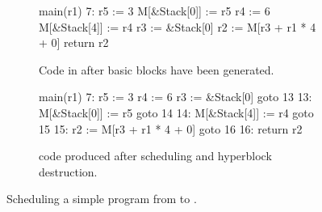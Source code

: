 \begin{figure}
  \centering
    \begin{subfigure}[b]{0.48\linewidth}
\lstset{numbers=left,basicstyle=\footnotesize\ttfamily,numberstyle=\tiny,keepspaces=true,showspaces=true,xleftmargin=20pt}
\begin{rtllisting}
main(r1) {
  7: {
    r5 := 3
    M[&Stack[0]] := r5
    r4 := 6
    M[&Stack[4]] := r4
    r3 := &Stack[0]
    r2 := M[r3 + r1 * 4 + 0]
    return r2
  }
}
\end{rtllisting}
      \caption{Code in \rtlblock{} after basic blocks have been generated.}\label{fig:accumulator_seq}
    \end{subfigure}\hfill%
    \begin{subfigure}[b]{0.48\linewidth}
\lstset{numbers=left,basicstyle=\footnotesize\ttfamily,numberstyle=\tiny,keepspaces=true,showspaces=true,xleftmargin=20pt}
\begin{rtllisting}
main(r1) {
  7: {
    r5 := 3
    r4 := 6
    r3 := &Stack[0]
    goto 13
  }
  13: {
    M[&Stack[0]] := r5
    goto 14
  }
  14: {
    M[&Stack[4]] := r4
    goto 15
  }
  15: {
    r2 := M[r3 + r1 * 4 + 0]
    goto 16
  }
  16: { return r2 }
}
\end{rtllisting}
      \caption{\rtlsubpar{} code produced after scheduling and hyperblock destruction.}\label{fig:accumulator_par}
    \end{subfigure}
    \caption{Scheduling a simple program from \rtlblock{} to
      \rtlpar{}.}\label{fig:accumulator_gblseqpar}
\end{figure}



